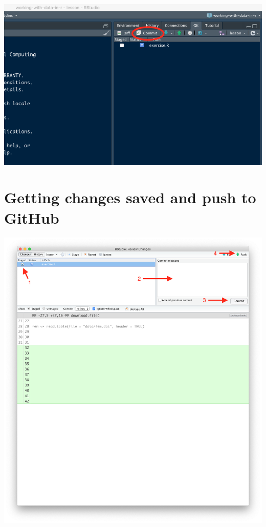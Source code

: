 \documentclass[
  12pt,
]{book}
\begin{document}
\includegraphics{images/commit_push_pull1.png}

\hypertarget{getting-changes-saved-and-push-to-github}{%
\section{Getting changes saved and push to GitHub}\label{getting-changes-saved-and-push-to-github}}

\includegraphics{images/commit_push_pull2.png}
\end{document}
